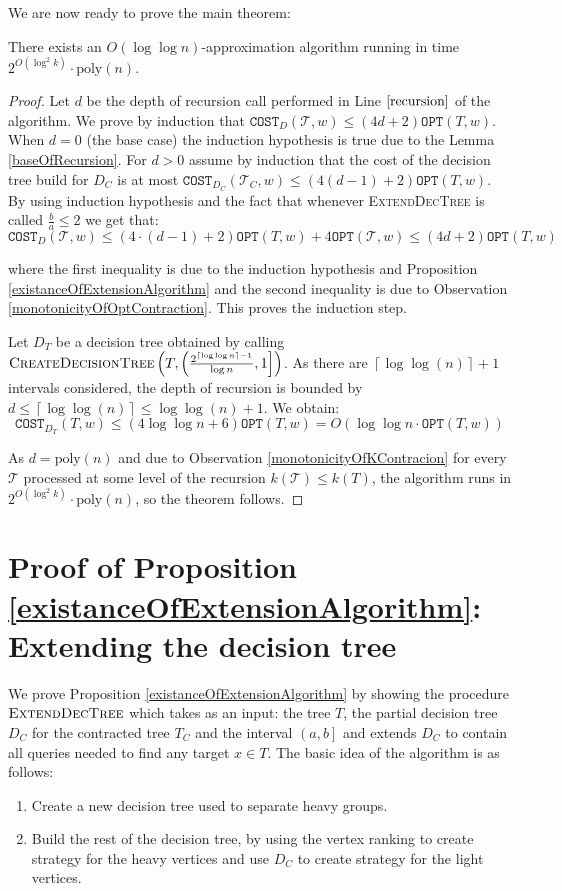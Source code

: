 \documentclass[a4paper, anonymous, numberwithinsect, pdfa, UKenglish,cleveref, autoref, thm-restate]{socg-lipics-v2021}
\newcommand{\br}[1]{\left( #1 \right)}
\newcommand{\cl}[1]{\left\lceil #1 \right\rceil}
\newcommand{\OPT}{\texttt{OPT}}
\newcommand{\COST}{\texttt{COST}}
\begin{document}
We are now ready to prove the main theorem: 
\begin{theorem}
\label{parametrizedAlgorithm}
    There exists an $O\br{\log\log n}$-approximation algorithm running in time $2^{O\br{\log^2k}}\cdot\text{poly}\br{n}$.
    \begin{proof}
    Let $d$ be the depth of recursion call performed in Line $\ref{recursion}$ of the algorithm. We prove by induction that $\COST_{D}\br{\mathcal{T}, w}\leq \br{4d +2}\OPT\br{T, w}$. When $d=0$ (the base case) the induction hypothesis is true due to the Lemma \ref{baseOfRecursion}. For $d>0$ assume by induction that the cost of the decision tree build for $D_C$ is at most $\COST_{D_C}\br{\mathcal{T}_C, w}\leq \br{4(d-1) +2}\OPT\br{T, w}$. By using induction hypothesis and the fact that whenever \textsc{ExtendDecTree} is called $\frac{b}{a}\leq 2$ we get that:
    $$
    \COST_{D}\br{\mathcal{T}, w}\leq \br{4\cdot (d-1) +2}\OPT\br{T, w} + 4\OPT\br{\mathcal{T}, w} \leq \br{4d +2}\OPT\br{T, w}
    $$ 

    where the first inequality is due to the induction hypothesis and Proposition \ref{existanceOfExtensionAlgorithm} and the second inequality is due to Observation \ref{monotonicityOfOptContraction}. This proves the induction step.
    
    Let $D_T$ be a decision tree obtained by calling $\textsc{CreateDecisionTree}\br{T,\left(\frac{2^{\cl{\log\log n}-1}}{\log n},1\right]}$. As there are $\cl{\log\log\br{n}}+1$ intervals considered, the depth of recursion is bounded by $d\leq
    \cl{\log\log\br{n}}\leq \log\log\br{n}+1$. We obtain:
    $$
    \COST_{D_T}\br{T, w}
    \leq
    \br{4\log\log n + 6}\OPT\br{T, w} = O\br{\log\log n\cdot \OPT\br{T, w}}
    $$

    As $d=\text{poly}\br{n}$ and due to Observation \ref{monotonicityOfKContracion} for every $\mathcal{T}$ processed at some level of the recursion $k\br{\mathcal{T}}\leq k\br{T}$, the algorithm runs in $2^{O\br{\log^2k}}\cdot\text{poly}\br{n}$, so the theorem follows.
        
    \end{proof}
\end{theorem}
\section{Proof of Proposition \ref{existanceOfExtensionAlgorithm}: Extending the decision tree}\label{extendingTheDecisionTree}
We prove Proposition \ref{existanceOfExtensionAlgorithm} by showing the procedure $\textsc{ExtendDecTree}$ which takes as an input: the tree $T$, the partial decision tree $D_C$ for the contracted tree $T_C$ and the interval $\left(a,b\right]$ and extends $D_C$ to contain all queries needed to find any target $x\in T$. The basic idea of the algorithm is as follows: 
\begin{enumerate}
    \item Create a new decision tree used to separate heavy groups. 
    \item Build the rest of the decision tree, by using the vertex ranking to create strategy for the heavy vertices and use $D_C$ to create strategy for the light vertices. 
\end{enumerate}
\end{document}
